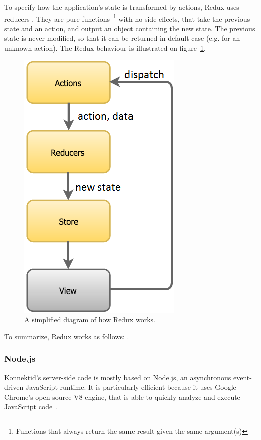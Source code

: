 To specify how the application's state is transformed by actions, Redux uses \guillemotleft{} reducers \guillemotright{}. They are pure functions~\footnote{Functions that always return the same result given the same argument(s)} with no side effects, that take the previous state and an action, and output an object containing the new state. The previous state is never modified, so that it can be returned in default case (e.g. for an unknown action). The Redux behaviour is illustrated on {\sc figure}~\ref{fig:reduxSumup}.

\begin{figure}[H]
    \centering
    \includegraphics[scale=0.7]{figure/reduxFlow.png}
    \caption{A simplified diagram of how Redux works.}
    \label{fig:reduxSumup}
\end{figure}

To summarize, Redux works as follows: .

\subsubsection{Node.js}
\label{sssec:node}

Konnektid's server-side code is mostly based on Node.js, an asynchronous event-driven JavaScript runtime. It is particularly efficient because it uses Google Chrome's open-source V8 engine, that is able to quickly analyze and execute JavaScript code~\cite{v8}.

